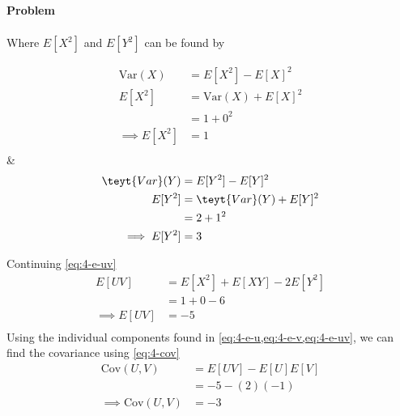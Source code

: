 \documentclass[12pt]{article}
\newenvironment{Ex}{\textbf{Problem}\vspace{.75em}\\}{}
\begin{document}
\begin{enumerate}
\begin{Ex}
\begin{solution}
\begin{equation}
\begin{aligned}
        \end{aligned}
      \end{equation}
      Where $E[X^2]$ and $E[Y^2]$ can be found by
      \begin{multicols}{2}
        \begin{equation}
          \label{eq:4-x-2}
          \begin{aligned}
            \text{Var}(X) &= E[X^2] - E[X]^2 \\
            E[X^2] &= \text{Var}(X) + E[X]^2 \\
            &= 1 + 0^2 \\
            \implies E[X^2] &= 1 \\
          \end{aligned}
        \end{equation} &
        \begin{equation}
          \label{eq:4-y-2}
          \begin{aligned}
            \teyt{Var}(Y) &= E[Y^2] - E[Y]^2 \\
            E[Y^2] &= \teyt{Var}(Y) + E[Y]^2 \\
            &= 2 + 1^2 \\
            \implies E[Y^2] &= 3 \\
          \end{aligned}
        \end{equation}
      \end{multicols}
      Continuing \cref{eq:4-e-uv}
      \begin{equation}
        \label{eq:4-e-uv-cont}
        \begin{aligned}
          E[UV] &= E[X^2] + E[XY] - 2E[Y^2] \\
          &= 1 + 0 - 6 \\
          \implies E[UV] &= -5 \\
        \end{aligned}
      \end{equation}
      Using the individual components found in
      \cref{eq:4-e-u,eq:4-e-v,eq:4-e-uv}, we can find the covariance
      using \cref{eq:4-cov}
      \begin{equation}
        \label{eq:4-cov-plugged}
        \begin{aligned}
          \text{Cov}(U,V) &= E[UV] - E[U]E[V] \\
          &= -5 - (2)(-1) \\
          \implies \text{Cov}(U,V) &= -3 \\
        \end{aligned}

\end{equation}
\end{solution}
\end{Ex}
\end{enumerate}
\end{document}

